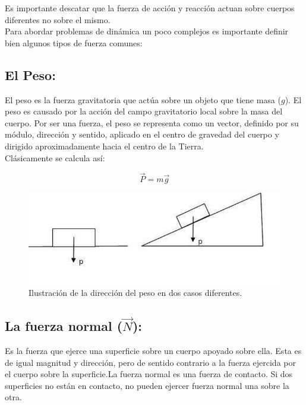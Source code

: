 Es importante descatar que la fuerza de acción y reacción actuan sobre cuerpos diferentes no sobre el mismo.\\

Para abordar problemas de dinámica un poco complejos es importante definir bien algunos tipos de fuerza comunes:

\subsection{El Peso:}

El peso es la fuerza gravitatoria que actúa sobre un objeto que tiene masa ($g$). El peso es causado por la acción del campo 
gravitatorio local sobre la masa del cuerpo. Por ser una fuerza, el peso se representa como un vector, definido por su módulo, 
dirección y sentido, aplicado en el centro de gravedad del cuerpo y dirigido aproximadamente hacia el centro de la Tierra.\\

Clásicamente se calcula así:

\begin{equation}
\vec{P} = m\vec{g}
\end{equation}

\begin{figure}[ht]
 \centering
 \includegraphics[scale=0.4]{images/peso.jpg}
 \caption{Ilustración de la dirección del peso en dos casos diferentes.}\label{ac}
\end{figure}

\subsection{La fuerza normal ($\vec{N}$):}

Es la fuerza que ejerce una superficie sobre un cuerpo apoyado sobre ella. Esta es de igual magnitud y dirección, pero de sentido 
contrario a la fuerza ejercida por el cuerpo sobre la superficie.La fuerza normal es una fuerza de contacto. Si dos superficies 
no están en contacto, no pueden ejercer fuerza normal una sobre la otra.\\

